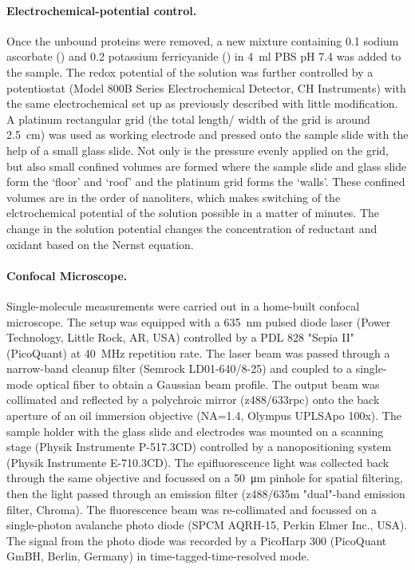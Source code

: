 \documentclass[journal=jacsat,manuscript=article]{achemso}
\begin{document}
\paragraph*{Electrochemical-potential control.}
Once the unbound proteins were removed, a new mixture containing \SI{0.1}{\mM} sodium ascorbate () and \SI{0.2}{\mM} potassium ferricyanide (\ce{[Fe(CN)6^3-]}) in \SI{4}{\ml} PBS pH 7.4 was added to the sample.
The redox potential of the solution was further controlled by a potentiostat (Model 800B Series Electrochemical Detector, CH Instruments) with the same electrochemical set up as previously described\cite{zhang2017gold} with little modification.
A platinum rectangular grid (the total length/ width of the grid is around \SI{2.5}{\cm}) was used as working electrode and pressed onto the sample slide with the help of a small glass slide.
Not only is the pressure evenly applied on the grid, but also small confined volumes are formed where the sample slide and glass slide form the `floor' and `roof' and the platinum grid forms the `walls'.
These confined volumes are in the order of nanoliters, which makes switching of the elctrochemical potential of the solution possible in a matter of minutes.
The change in the solution potential changes the concentration of reductant and oxidant based on the Nernst equation.

\paragraph*{Confocal Microscope.}
Single-molecule measurements were carried out in a home-built confocal microscope.
The setup was equipped with a \SI{635}{\nm} pulsed diode laser (Power Technology, Little Rock, AR, USA) controlled by a PDL 828 "Sepia II" (PicoQuant) at \SI{40}{\MHz} repetition rate.
The laser beam was passed through a narrow-band cleanup filter (Semrock LD01-640/8-25) and coupled to a single-mode optical fiber to obtain a Gaussian beam profile.
The output beam was collimated and reflected by a polychroic mirror (z488/633rpc) onto the back aperture of an oil immersion objective (NA=1.4, Olympus UPLSApo 100x).
The sample holder with the glass slide and electrodes was mounted on a scanning stage (Physik Instrumente P-517.3CD) controlled by a nanopositioning system (Physik Instrumente E-710.3CD). 
The epifluorescence light was collected back through the same objective and focussed on a \SI{50}{\um} pinhole for spatial filtering, then the light passed through an emission filter (z488/635m "dual"-band emission filter, Chroma). 
The fluorescence beam was re-collimated and focussed on a single-photon avalanche photo diode (SPCM AQRH-15, Perkin Elmer Inc., USA).
The signal from the photo diode was recorded by a PicoHarp 300 (PicoQuant GmBH, Berlin, Germany) in time-tagged-time-resolved mode.
\end{document}
